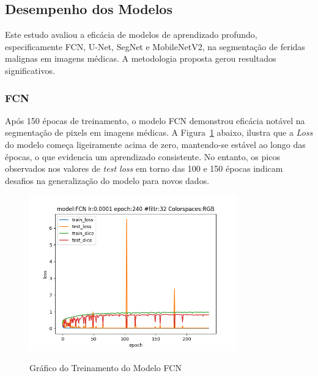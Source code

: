 \subsection{Desempenho dos Modelos}

    
    
Este estudo avaliou a eficácia de modelos de aprendizado profundo, especificamente \ac{FCN}, \ac{U-Net}, \ac{SegNet} e \ac{MobileNetV2}, na segmentação de feridas malignas em imagens médicas. A metodologia proposta gerou resultados significativos.
    
\subsubsection{FCN}
Após 150 épocas de treinamento, o modelo \ac{FCN} demonstrou eficácia notável na segmentação de pixels em imagens médicas. A Figura~\ref{fig:graphFCN} abaixo, ilustra que a \textit{Loss} do modelo começa ligeiramente acima de zero, mantendo-se estável ao longo das épocas, o que evidencia um aprendizado consistente. No entanto, os picos observados nos valores de \textit{test loss} em torno das 100 e 150 épocas indicam desafios na generalização do modelo para novos dados.

\begin{figure}[htbp]
    \centering
    \caption{Gráfico do Treinamento do Modelo \acf{FCN}}
    \includegraphics[width=0.8\textwidth]{img/fcnmodelfile.png}
    \label{fig:graphFCN}
\end{figure}

